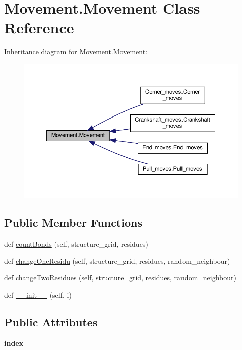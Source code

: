 \hypertarget{classMovement_1_1Movement}{}\section{Movement.\+Movement Class Reference}
\label{classMovement_1_1Movement}


Inheritance diagram for Movement.\+Movement\+:
\nopagebreak
\begin{figure}[H]
\begin{center}
\leavevmode
\includegraphics[width=350pt]{classMovement_1_1Movement__inherit__graph}
\end{center}
\end{figure}
\subsection*{Public Member Functions}
\begin{DoxyCompactItemize}
\item 
def \hyperlink{classMovement_1_1Movement_a9a5855cfc798666c18371ea030ae54a7}{count\+Bonds} (self, structure\+\_\+grid, residues)
\item 
def \hyperlink{classMovement_1_1Movement_ac3dec9f23b8e853ac5101535ee804767}{change\+One\+Residu} (self, structure\+\_\+grid, residues, random\+\_\+neighbour)
\item 
def \hyperlink{classMovement_1_1Movement_a9052fb0d7d5328a995abee94111d9fcc}{change\+Two\+Residues} (self, structure\+\_\+grid, residues, random\+\_\+neighbour)
\item 
def \hyperlink{classMovement_1_1Movement_a30e499b5ab0257aac5ee77dc24c161b5}{\+\_\+\+\_\+init\+\_\+\+\_\+} (self, i)
\end{DoxyCompactItemize}
\subsection*{Public Attributes}
\begin{DoxyCompactItemize}
\item 
\mbox{\label{classMovement_1_1Movement_a8972b130eb57f4921311faf370d11c79}} 
{\bfseries index}
\end{DoxyCompactItemize}


